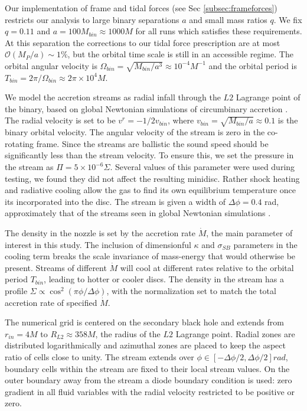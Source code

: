 \documentclass{emulateapj}
\newcommand{\De}{\Delta}
\newcommand{\sig}{\sigma}
\newcommand{\Sig}{\Sigma}
\newcommand{\ka}{\kappa}
\newcommand{\Om}{\Omega}
\newcommand{\OO}{\mathcal{O}}
\begin{document}
Our implementation of frame and tidal forces (see Sec \ref{subsec:frameforces}) restricts our analysis to large binary separations $a$ and small mass ratios $q$.  We fix $q=0.11$ and $a = 100 M_{bin} \approx 1000 M$ for all runs which satisfies these requirements.  At this separation the corrections to our tidal force prescription are at most $\OO({M_P / a}) \sim 1\%$, but the orbital time scale is still in an accessible regime.  The orbital angular velocity is $\Om_{bin} = \sqrt{M_{bin} / a^3} \approx 10^{-4} M^{-1}$ and the orbital period is $T_{bin} = 2\pi / \Om_{bin} \approx 2 \pi \times 10^4 M$.

We model the accretion streams as radial infall through the $L2$ Lagrange point of the binary, based on global Newtonian simulations of circumbinary accretion \citep{Farris14, Farris15A, Farris15B, DOrazio12, DOrazio16}.  The radial velocity is set to be $v^r = -1/2 v_{bin}$, where $v_{bin} = \sqrt{M_{bin}/a} \approx 0.1$ is the binary orbital velocity.  The angular velocity of the stream is zero in the co-rotating frame.  Since the streams are ballistic the sound speed should be significantly less than the stream velocity.  To ensure this, we set the pressure in the stream as $\Pi = 5 \times 10^{-6} \Sig$.  Several values of this parameter were used during testing, we found they did not affect the resulting minidisc. Rather shock heating and radiative cooling allow the gas to find its own equilibrium temperature once its incorporated into the disc.  The stream is given a width of $ \De \phi = 0.4$ rad, approximately that of the streams seen in global Newtonian simulations \cite{Farris14}.

The density in the nozzle is set by the accretion rate $\dot{M}$, the main parameter of interest in this study.  The inclusion of dimensionful $\ka$ and $\sig_{SB}$ parameters in the cooling term breaks the scale invariance of mass-energy that would otherwise be present.  Streams of different $\dot{M}$ will cool at different rates relative to the orbital period $T_{bin}$, leading to hotter or cooler discs.  The density in the stream has a profile $\Sig \propto \cos^2(\pi \phi / \De \phi)$, with the normalization set to match the total accretion rate of specified $\dot{M}$.

The numerical grid is centered on the secondary black hole and extends from $r_{in} = 4 M$ to $R_{L2} \approx 358 M$, the radius of the $L2$ Lagrange point. Radial zones are distributed logarithmically and azimuthal zones are placed to keep the aspect ratio of cells close to unity. The stream extends over $\phi \in [-\De \phi / 2, \De \phi / 2] rad$, boundary cells within the stream are fixed to their local stream values. On the outer boundary away from the stream a diode boundary condition is used: zero gradient in all fluid variables with the radial velocity restricted to be positive or zero.
\end{document}

